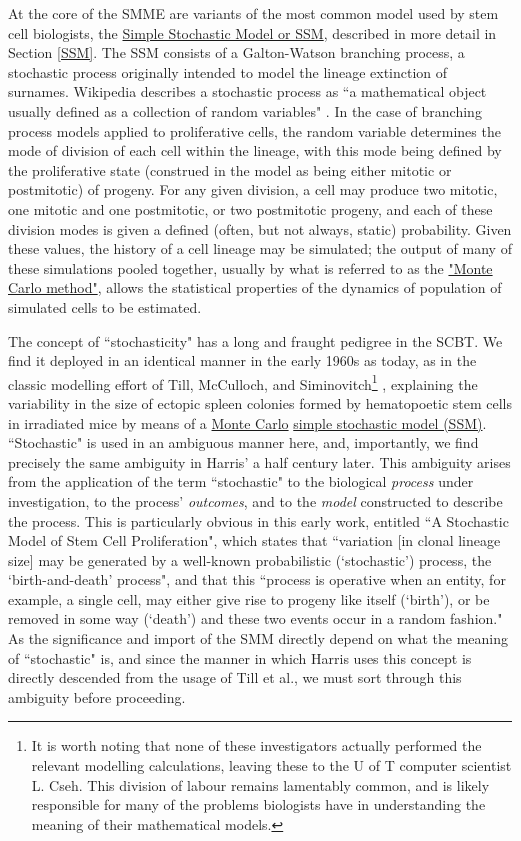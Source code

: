 \label{TMS}
At the core of the SMME are variants of the most common model used by stem cell biologists, the \hyperref[SSM]{Simple Stochastic Model or SSM}, described in more detail in Section \ref{SSM}. The SSM consists of a Galton-Watson branching process, a stochastic process originally intended to model the lineage extinction of surnames. Wikipedia describes a stochastic process as ``a mathematical object usually defined as a collection of random variables" \cite{Wikipedia2018}. In the case of branching process models applied to proliferative cells, the random variable determines the mode of division of each cell within the lineage, with this mode being defined by the proliferative state (construed in the model as being either mitotic or postmitotic) of progeny. For any given division, a cell may produce two mitotic, one mitotic and one postmitotic, or two postmitotic progeny, and each of these division modes is given a defined (often, but not always, static) probability. Given these values, the history of a cell lineage may be simulated; the output of many of these simulations pooled together, usually by what is referred to as the \hyperref[MonteCarlo]{"Monte Carlo method"}, allows the statistical properties of the dynamics of population of simulated cells to be estimated.

The concept of ``stochasticity" has a long and fraught pedigree in the SCBT. We find it deployed in an identical manner in the early 1960s as today, as in the classic modelling effort of Till, McCulloch, and Siminovitch\footnote{It is worth noting that none of these investigators actually performed the relevant modelling calculations, leaving these to the U of T computer scientist L. Cseh. This division of labour remains lamentably common, and is likely responsible for many of the problems biologists have in understanding the meaning of their mathematical models.} \cite{Till1964}, explaining the variability in the size of ectopic spleen colonies formed by hematopoetic stem cells in irradiated mice by means of a \hyperref[MonteCarlo]{Monte Carlo} \hyperref[SSM]{simple stochastic model (SSM)}. \label{TMSmodel} ``Stochastic" is used in an ambiguous manner here, and, importantly, we find precisely the same ambiguity in Harris' a half century later. This ambiguity arises from the application of the term ``stochastic" to the biological \textit{process} under investigation, to the process' \textit{outcomes}, and to the \textit{model} constructed to describe the process. This is particularly obvious in this early work, entitled ``A Stochastic Model of Stem Cell Proliferation", which states that ``variation [in clonal lineage size] may be generated by a well-known probabilistic (`stochastic') process, the `birth-and-death' process", and that this ``process is operative when an entity, for example, a single cell, may either give rise to progeny like itself (`birth'), or be removed in some way (`death') and these two events occur in a random fashion." \cite{Till1964} As the significance and import of the SMM directly depend on what the meaning of ``stochastic" is, and since the manner in which Harris uses this concept is directly descended from the usage of Till et al., we must sort through this ambiguity before proceeding.

